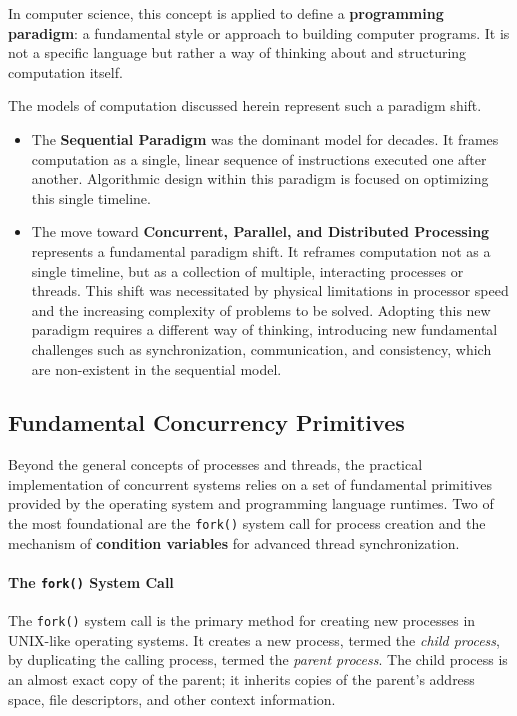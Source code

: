 In computer science, this concept is applied to define a \textbf{programming paradigm}: a fundamental style or approach to building computer programs. It is not a specific language but rather a way of thinking about and structuring computation itself.

The models of computation discussed herein represent such a paradigm shift.
\begin{itemize}
    \item The \textbf{Sequential Paradigm} was the dominant model for decades. It frames computation as a single, linear sequence of instructions executed one after another. Algorithmic design within this paradigm is focused on optimizing this single timeline.
    
    \item The move toward \textbf{Concurrent, Parallel, and Distributed Processing} represents a fundamental paradigm shift. It reframes computation not as a single timeline, but as a collection of multiple, interacting processes or threads. This shift was necessitated by physical limitations in processor speed and the increasing complexity of problems to be solved. Adopting this new paradigm requires a different way of thinking, introducing new fundamental challenges such as synchronization, communication, and consistency, which are non-existent in the sequential model.
\end{itemize}
\hline

\subsection{Fundamental Concurrency Primitives}
Beyond the general concepts of processes and threads, the practical implementation of concurrent systems relies on a set of fundamental primitives provided by the operating system and programming language runtimes. Two of the most foundational are the \texttt{fork()} system call for process creation and the mechanism of \textbf{condition variables} for advanced thread synchronization.

\paragraph{The \texttt{fork()} System Call}
The \texttt{fork()} system call is the primary method for creating new processes in UNIX-like operating systems. It creates a new process, termed the \textit{child process}, by duplicating the calling process, termed the \textit{parent process}. The child process is an almost exact copy of the parent; it inherits copies of the parent's address space, file descriptors, and other context information.

